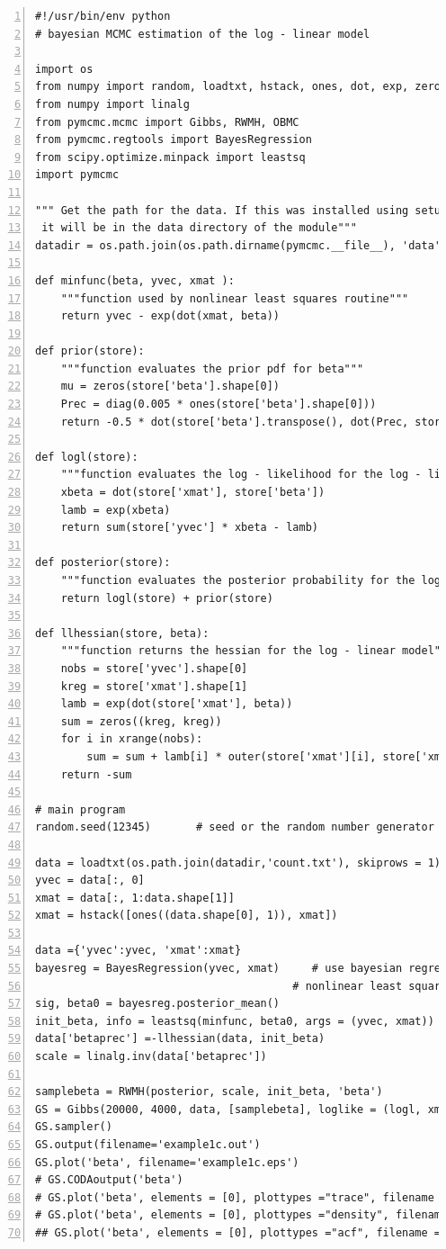 \documentclass[article]{jss}
\begin{document}
\begin{lstlisting}[basicstyle={\scriptsize},numbers=left]
#!/usr/bin/env python
# bayesian MCMC estimation of the log - linear model

import os
from numpy import random, loadtxt, hstack, ones, dot, exp, zeros, outer, diag
from numpy import linalg
from pymcmc.mcmc import Gibbs, RWMH, OBMC
from pymcmc.regtools import BayesRegression
from scipy.optimize.minpack import leastsq
import pymcmc

""" Get the path for the data. If this was installed using setup.py
 it will be in the data directory of the module"""
datadir = os.path.join(os.path.dirname(pymcmc.__file__), 'data')

def minfunc(beta, yvec, xmat ):
    """function used by nonlinear least squares routine"""
    return yvec - exp(dot(xmat, beta))

def prior(store):
    """function evaluates the prior pdf for beta"""
    mu = zeros(store['beta'].shape[0])
    Prec = diag(0.005 * ones(store['beta'].shape[0]))
    return -0.5 * dot(store['beta'].transpose(), dot(Prec, store['beta']))

def logl(store):
    """function evaluates the log - likelihood for the log - linear model"""
    xbeta = dot(store['xmat'], store['beta'])
    lamb = exp(xbeta)
    return sum(store['yvec'] * xbeta - lamb)

def posterior(store):
    """function evaluates the posterior probability for the log - linear model"""
    return logl(store) + prior(store)

def llhessian(store, beta):
    """function returns the hessian for the log - linear model"""
    nobs = store['yvec'].shape[0]
    kreg = store['xmat'].shape[1]
    lamb = exp(dot(store['xmat'], beta))
    sum = zeros((kreg, kreg))
    for i in xrange(nobs):
        sum = sum + lamb[i] * outer(store['xmat'][i], store['xmat'][i])
    return -sum

# main program
random.seed(12345)       # seed or the random number generator

data = loadtxt(os.path.join(datadir,'count.txt'), skiprows = 1)    # loads data from file
yvec = data[:, 0]
xmat = data[:, 1:data.shape[1]]
xmat = hstack([ones((data.shape[0], 1)), xmat])

data ={'yvec':yvec, 'xmat':xmat} 
bayesreg = BayesRegression(yvec, xmat)     # use bayesian regression to initialise
                                        # nonlinear least squares algorithm
sig, beta0 = bayesreg.posterior_mean()
init_beta, info = leastsq(minfunc, beta0, args = (yvec, xmat))
data['betaprec'] =-llhessian(data, init_beta)
scale = linalg.inv(data['betaprec'])

samplebeta = RWMH(posterior, scale, init_beta, 'beta')
GS = Gibbs(20000, 4000, data, [samplebeta], loglike = (logl, xmat.shape[1], 'yvec'))
GS.sampler()
GS.output(filename='example1c.out') 
GS.plot('beta', filename='example1c.eps')
# GS.CODAoutput('beta')
# GS.plot('beta', elements = [0], plottypes ="trace", filename ="xx.pdf")
# GS.plot('beta', elements = [0], plottypes ="density", filename ="xx.png")
## GS.plot('beta', elements = [0], plottypes ="acf", filename ="yy.ps")

\end{lstlisting}
\end{document}

